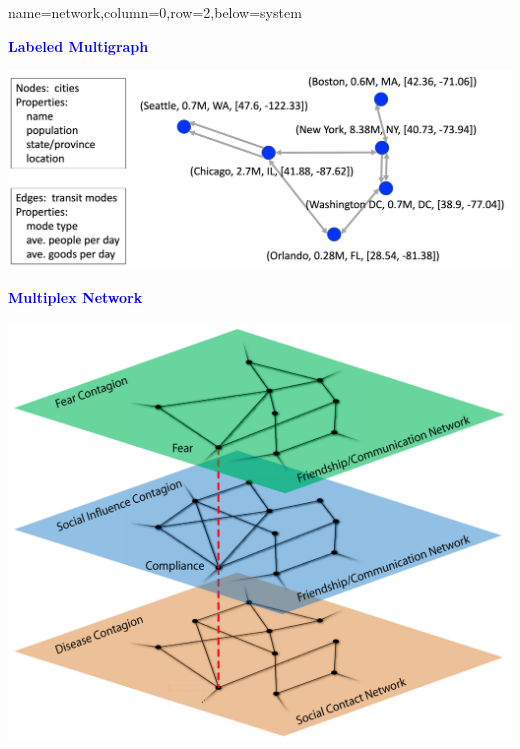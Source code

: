 \documentclass[landscape,paperwidth=70in,paperheight=46in,fontscale=0.225]{baposter} %
\begin{document}
\begin{poster}
          {name=network,column=0,row=2,below=system}{         

\begin{minipage}{.5\textwidth}
\begin{center}
\textcolor{blue}{\textbf{Labeled Multigraph}}
\end{center}
\vspace{3mm}

\centering
\includegraphics[scale=0.25]{figures/single_net.png}
\end{minipage}
\hfill
 \begin{minipage}{.35\textwidth}   
 \textcolor{blue}{\textbf{Multiplex Network}}
 \vspace{3mm}
 
 \centering
\includegraphics[scale=0.35]{figures/multi_net.png}
\end{minipage}
\vspace*{0.2in}
}



\end{poster}
\end{document}
